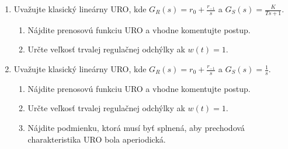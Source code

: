 \documentclass[a4paper, 10pt, ]{article}
\begin{document}
\begin{enumerate}[leftmargin=0pt, labelsep=3mm, itemsep=0pt]
    \item Uvažujte klasický lineárny URO, kde $\displaystyle G_R(s) = r_0 + \frac{r_{-1}}{s}$ a $\displaystyle G_S(s) = \frac{K}{Ts + 1}$.
    \begin{enumerate}
        \item Nájdite prenosovú funkciu URO a vhodne komentujte postup.
        \item Určte veľkosť trvalej regulačnej odchýlky ak $w(t) = 1$.
    \end{enumerate}

    \item Uvažujte klasický lineárny URO, kde $\displaystyle G_R(s) = r_0 + \frac{r_{-1}}{s}$ a $\displaystyle G_S(s) = \frac{1}{s}$.
    \begin{enumerate}
        \item Nájdite prenosovú funkciu URO a vhodne komentujte postup.
        \item Určte veľkosť trvalej regulačnej odchýlky ak $w(t) = 1$.
        \item Nájdite podmienku, ktorá musí byť splnená, aby prechodová charakteristika URO bola aperiodická.
    \end{enumerate}






\end{enumerate}
\end{document}
